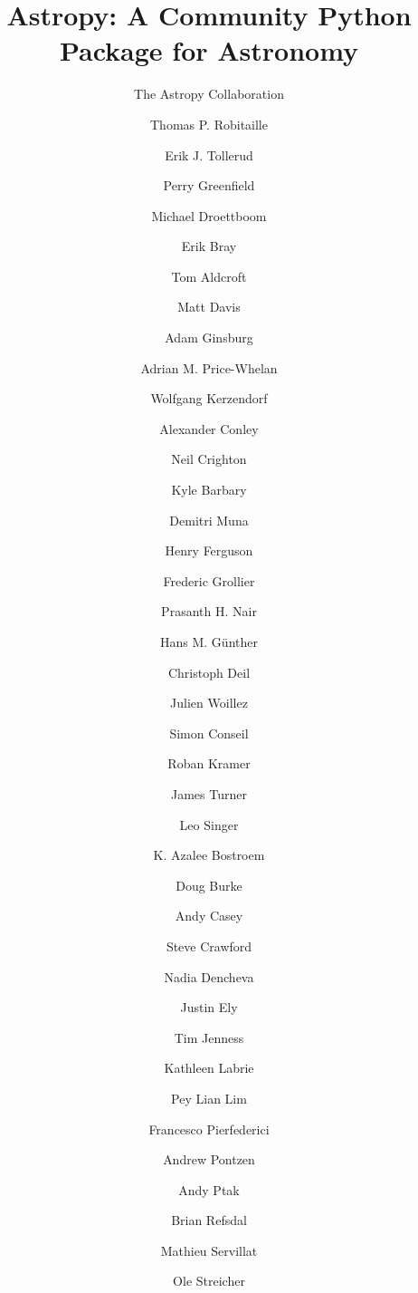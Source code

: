 \documentclass[traditabstract]{aa}
\begin{document}



\title{Astropy: A Community Python Package for Astronomy}




\author{
The Astropy Collaboration
  \and
Thomas P. Robitaille\inst{\ref{inst:mpia}}  %
  \and
Erik J. Tollerud\inst{\ref{inst:yale}}  %
  \and
Perry Greenfield\inst{\ref{inst:stsci}}  %
  \and
Michael Droettboom\inst{\ref{inst:stsci}}  %
  \and
Erik Bray\inst{\ref{inst:stsci}}
  \and
Tom Aldcroft\inst{\ref{inst:cfa}}  %
  \and
Matt Davis\inst{\ref{inst:stsci}}  %
  \and
Adam Ginsburg\inst{\ref{inst:colorado}}  %
  \and
Adrian M. Price-Whelan\inst{\ref{inst:columbia}}  %
  \and
Wolfgang Kerzendorf\inst{\ref{inst:toronto}}
  \and
Alexander Conley\inst{\ref{inst:colorado}}
  \and
Neil Crighton\inst{\ref{inst:mpia}}  %
  \and
Kyle Barbary\inst{\ref{inst:argonne}}  %
  \and
Demitri Muna\inst{\ref{inst:osu}}  %
  \and
Henry Ferguson\inst{\ref{inst:stsci}}
  \and
Frederic Grollier
  \and
Prasanth H. Nair\inst{\ref{inst:freelance}}  %
  \and
Hans M. G\"unther\inst{\ref{inst:cfa}}  %
  \and
Christoph Deil\inst{\ref{inst:mpik}}  %
  \and
Julien Woillez
  \and
Simon Conseil\inst{\ref{inst:oamp}}
  \and
Roban Kramer  %
  \and
James Turner\inst{\ref{inst:gemini_s}}  %
  \and
Leo Singer\inst{\ref{inst:ligo}}  %
  \and
K. Azalee Bostroem\inst{\ref{inst:stsci}}  %
  \and
Doug Burke\inst{\ref{inst:cfa}}  %
  \and
Andy Casey\inst{\ref{inst:stromlo}}  %
  \and
Steve Crawford\inst{\ref{inst:saao}}
  \and
Nadia Dencheva\inst{\ref{inst:stsci}}  %
  \and
Justin Ely\inst{\ref{inst:stsci}}  %
  \and
Tim Jenness\inst{\ref{inst:jac}}  %
  \and
Kathleen Labrie\inst{\ref{inst:gemini_n}}  %
  \and
Pey Lian Lim\inst{\ref{inst:stsci}}  %
  \and
Francesco Pierfederici\inst{\ref{inst:stsci}}  %
  \and
Andrew Pontzen\inst{\ref{inst:oxford}}  %
  \and
Andy Ptak\inst{\ref{inst:gsfc}}  %
  \and
Brian Refsdal  %
  \and
Mathieu Servillat\inst{\ref{inst:saclay}}  %
  \and
Ole Streicher\inst{\ref{inst:leibniz}}  %
}
\end{document}
